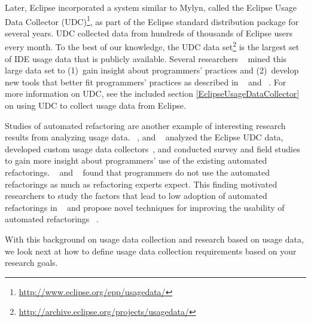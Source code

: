 %
Later, Eclipse incorporated a system similar to Mylyn, called the Eclipse Usage
Data Collector (UDC)\footnote{\url{http://www.eclipse.org/epp/usagedata/}}, as part of the Eclipse standard
distribution package for several years. UDC collected data from hundreds of
thousands of Eclipse users every month. To the best of our knowledge, the UDC
data set\footnote{\url{http://archive.eclipse.org/projects/usagedata/}} is the largest set of IDE usage data that is publicly
available. Several researchers  ~ mined this large
data set to
%
(1)~gain insight about programmers'
practices and
%
(2)~develop new tools that better fit programmers'
practices as described in ~\cite{MurphyHill2012Improving} and ~\cite{VakilianETAL2013Compositional}.
For more information on UDC, see the included section \ref {EclipseUsageDataCollector} on using UDC to collect usage data from Eclipse.

Studies of automated refactoring are another example of interesting research results from analyzing usage data. ~, and ~ analyzed the Eclipse UDC
data, developed
custom usage data collectors~\cite{VakilianETAL2012UseDisuseMisuse}, and
conducted survey and field studies~ to gain more
insight about programmers' use of the existing automated refactorings. ~ and
~
 found that programmers do not use the automated refactorings as
much as refactoring experts expect. This finding motivated researchers to study
the factors that lead to low adoption of automated
refactorings in ~\cite{VakilianETAL2012UseDisuseMisuse,V:MurphyHill2012How} and
propose novel techniques for improving the usability of automated
refactorings
~.

With this background on usage data collection and research based on usage data, we look next at how to define usage data collection requirements based on your research goals.

